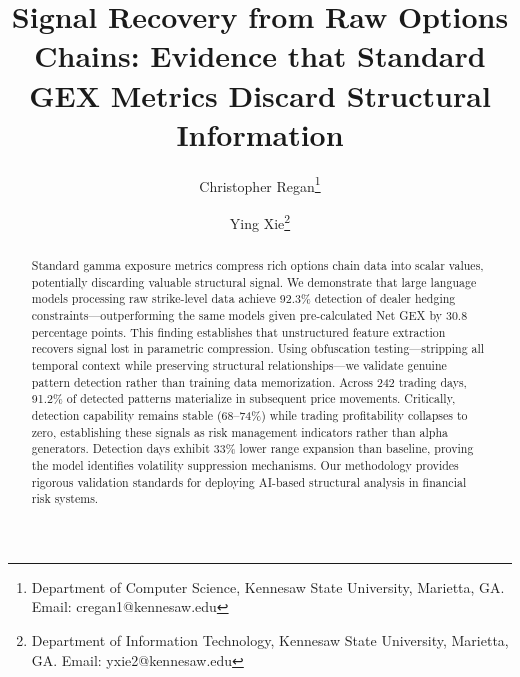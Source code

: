\documentclass[12pt,letterpaper]{article}
\begin{document}
\title{Signal Recovery from Raw Options Chains: Evidence that Standard GEX Metrics Discard Structural Information}

\author{
Christopher Regan\thanks{Department of Computer Science, Kennesaw State University, Marietta, GA. Email: cregan1@kennesaw.edu}
\and
Ying Xie\thanks{Department of Information Technology, Kennesaw State University, Marietta, GA. Email: yxie2@kennesaw.edu}
}

\date{} %

\maketitle

\begin{abstract}
Standard gamma exposure metrics compress rich options chain data into scalar values, potentially discarding valuable structural signal. We demonstrate that large language models processing raw strike-level data achieve 92.3\% detection of dealer hedging constraints---outperforming the same models given pre-calculated Net GEX by 30.8 percentage points. This finding establishes that unstructured feature extraction recovers signal lost in parametric compression. Using obfuscation testing---stripping all temporal context while preserving structural relationships---we validate genuine pattern detection rather than training data memorization. Across 242 trading days, 91.2\% of detected patterns materialize in subsequent price movements. Critically, detection capability remains stable (68--74\%) while trading profitability collapses to zero, establishing these signals as risk management indicators rather than alpha generators. Detection days exhibit 33\% lower range expansion than baseline, proving the model identifies volatility suppression mechanisms. Our methodology provides rigorous validation standards for deploying AI-based structural analysis in financial risk systems.
\end{abstract}
\end{document}
